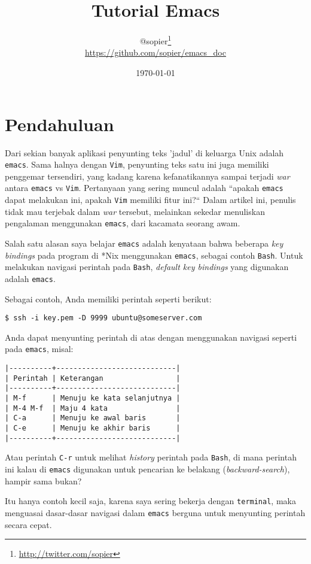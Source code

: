 \documentclass{article}
\title{Tutorial Emacs}
\author{
  @sopier\footnote{\url{http://twitter.com/sopier}}\\
  \footnotesize{\url{https://github.com/sopier/emacs\_doc}}
}
\date{\today}
\begin{document}
\maketitle
\tableofcontents
\pagebreak

\section{Pendahuluan}
Dari sekian banyak aplikasi penyunting teks 'jadul' di keluarga
Unix adalah \verb=emacs=. Sama halnya dengan \verb=Vim=, penyunting
teks satu ini juga memiliki penggemar tersendiri, yang kadang
karena kefanatikannya sampai terjadi \emph{war} antara \verb=emacs=
vs \verb=Vim=. Pertanyaan yang sering muncul adalah ``apakah
\verb=emacs= dapat melakukan ini, apakah \verb=Vim= memiliki fitur
ini?`` Dalam artikel ini, penulis tidak mau terjebak dalam 
\emph{war} tersebut, melainkan sekedar menuliskan pengalaman 
menggunakan \verb=emacs=, dari kacamata seorang awam.

Salah satu alasan saya belajar \verb=emacs= adalah kenyataan
bahwa beberapa \emph{key bindings} pada program di *Nix 
menggunakan \verb=emacs=, sebagai contoh \verb=Bash=. Untuk
melakukan navigasi perintah pada \verb=Bash=, 
\emph{default key bindings} yang digunakan adalah \verb=emacs=.

Sebagai contoh, Anda memiliki perintah seperti berikut:

\begin{verbatim}
$ ssh -i key.pem -D 9999 ubuntu@someserver.com
\end{verbatim}

Anda dapat menyunting perintah di atas dengan menggunakan
navigasi seperti pada \verb=emacs=, misal:

\begin{verbatim}
|----------+----------------------------|
| Perintah | Keterangan                 |
|----------+----------------------------|
| M-f      | Menuju ke kata selanjutnya |
| M-4 M-f  | Maju 4 kata                |
| C-a      | Menuju ke awal baris       |
| C-e      | Menuju ke akhir baris      |
|----------+----------------------------|
\end{verbatim}

Atau perintah \verb=C-r= untuk melihat \emph{history} perintah
pada \verb=Bash=, di mana perintah ini kalau di \verb=emacs=
digunakan untuk pencarian ke belakang (\emph{backward-search}),
hampir sama bukan?

Itu hanya contoh kecil saja, karena saya sering bekerja dengan
\verb=terminal=, maka menguasai dasar-dasar navigasi dalam
\verb=emacs= berguna untuk menyunting perintah secara cepat.
\end{document}
